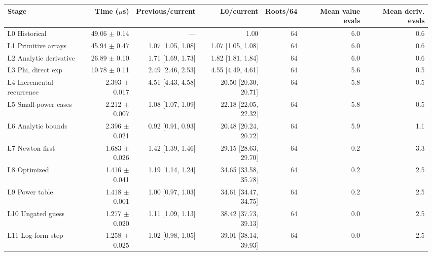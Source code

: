 \begin{tabular}{lrrrrrr}
\toprule
Stage & Time ($\mu$s) & Previous/current & L0/current & Roots/64 & Mean value evals & Mean deriv. evals \\
\midrule
L0 Historical & 49.06 $\pm$ 0.14 & --- & 1.00 & 64 & 6.0 & 0.6 \\
L1 Primitive arrays & 45.94 $\pm$ 0.47 & 1.07 [1.05, 1.08] & 1.07 [1.05, 1.08] & 64 & 6.0 & 0.6 \\
L2 Analytic derivative & 26.89 $\pm$ 0.10 & 1.71 [1.69, 1.73] & 1.82 [1.81, 1.84] & 64 & 6.0 & 0.6 \\
L3 Phi, direct exp & 10.78 $\pm$ 0.11 & 2.49 [2.46, 2.53] & 4.55 [4.49, 4.61] & 64 & 5.6 & 0.5 \\
L4 Incremental recurrence & 2.393 $\pm$ 0.017 & 4.51 [4.43, 4.58] & 20.50 [20.30, 20.71] & 64 & 5.8 & 0.5 \\
L5 Small-power cases & 2.212 $\pm$ 0.007 & 1.08 [1.07, 1.09] & 22.18 [22.05, 22.32] & 64 & 5.8 & 0.5 \\
L6 Analytic bounds & 2.396 $\pm$ 0.021 & 0.92 [0.91, 0.93] & 20.48 [20.24, 20.72] & 64 & 5.9 & 1.1 \\
L7 Newton first & 1.683 $\pm$ 0.026 & 1.42 [1.39, 1.46] & 29.15 [28.63, 29.70] & 64 & 0.2 & 3.3 \\
L8 Optimized & 1.416 $\pm$ 0.041 & 1.19 [1.14, 1.24] & 34.65 [33.58, 35.78] & 64 & 0.2 & 2.5 \\
L9 Power table & 1.418 $\pm$ 0.001 & 1.00 [0.97, 1.03] & 34.61 [34.47, 34.75] & 64 & 0.2 & 2.5 \\
L10 Ungated guess & 1.277 $\pm$ 0.020 & 1.11 [1.09, 1.13] & 38.42 [37.73, 39.13] & 64 & 0.0 & 2.5 \\
L11 Log-form step & 1.258 $\pm$ 0.025 & 1.02 [0.98, 1.05] & 39.01 [38.14, 39.93] & 64 & 0.0 & 2.5 \\
\bottomrule
\end{tabular}
